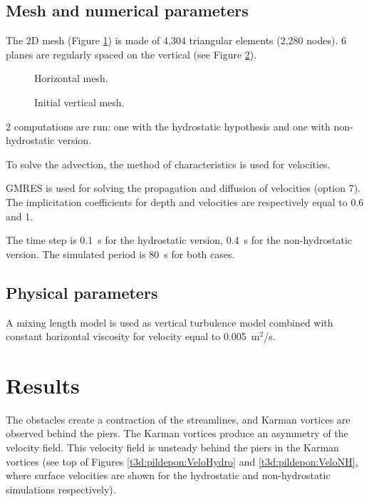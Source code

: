 \subsection{Mesh and numerical parameters}

The 2D mesh (Figure \ref{t3d:pildepon:fig:meshH})
is made of 4,304 triangular elements (2,280 nodes).
6 planes are regularly spaced on the vertical (see Figure \ref{t3d:pildepon:fig:meshV}).\\

\begin{figure}[!htbp]
 \centering
 \caption{Horizontal mesh.}
 \label{t3d:pildepon:fig:meshH}
\end{figure}

\begin{figure}[!htbp]
 \centering
 \caption{Initial vertical mesh.}
 \label{t3d:pildepon:fig:meshV}
\end{figure}

2 computations are run: one with the hydrostatic hypothesis and one with
non-hydrostatic version.

To solve the advection, the method of characteristics is used for velocities.

GMRES is used for solving the propagation and diffusion of velocities (option 7).
The implicitation coefficients for depth and velocities are respectively equal
to 0.6 and 1.

The time step is 0.1~s for the hydrostatic version, 0.4~s for the
non-hydrostatic version.
The simulated period is 80~s for both cases.

\subsection{Physical parameters}

A mixing length model is used as vertical turbulence model combined with
constant horizontal viscosity for velocity equal to 0.005~m$^2$/s.

\section{Results}

The obstacles create a contraction of the streamlines, and Karman
vortices are observed behind the piers.
The Karman vortices produce an asymmetry of the velocity field.
This velocity field is unsteady behind the piers in the Karman vortices
(see top of Figures \ref{t3d:pildepon:VeloHydro} and \ref{t3d:pildepon:VeloNH},
where surface velocities are
shown for the hydrostatic and non-hydrostatic simulations respectively).

